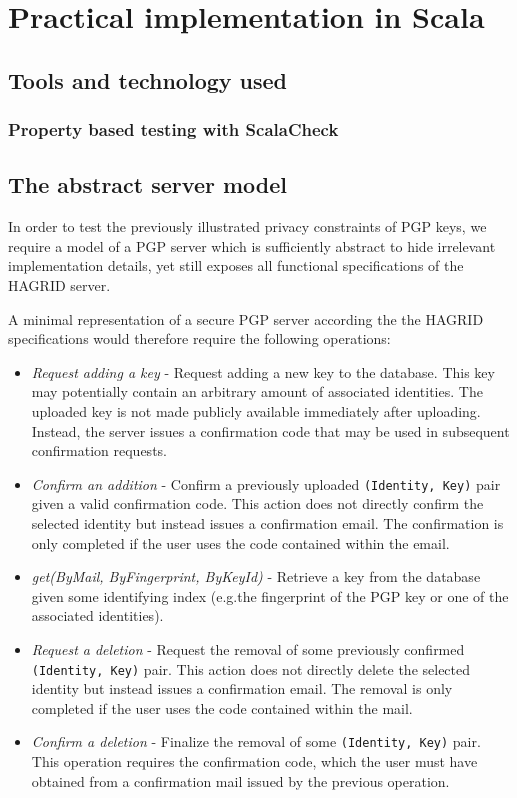 
\section{Practical implementation in Scala}
\subsection{Tools and technology used}
\newpage
\subsubsection{Property based testing with ScalaCheck}
\newpage
\subsection{The abstract server model}
In order to test the previously illustrated privacy constraints of PGP keys, we require a model of a PGP server which is sufficiently abstract to hide irrelevant implementation details, yet still exposes all functional specifications of the HAGRID server.

A minimal representation of a secure PGP server according the the HAGRID specifications would therefore require the following operations:
\begin{itemize}
    \item \emph{Request adding a key} - Request adding a new key to the database. This key may potentially contain an arbitrary amount of associated identities. The uploaded key is not made publicly available immediately after uploading. Instead, the server issues a confirmation code that may be used in subsequent confirmation requests.
    \item \emph{Confirm an addition} - Confirm a previously uploaded \texttt{(Identity, Key)} pair given a valid confirmation code. This action does not directly confirm the selected identity but instead issues a confirmation email. The confirmation is only completed if the user uses the code contained within the email.
    \item \emph{get(ByMail, ByFingerprint, ByKeyId)} - Retrieve a key from the database given some identifying index (e.g.the fingerprint of the PGP key or one of the associated identities).
    \item \emph{Request a deletion} - Request the removal of some previously confirmed \texttt{(Identity, Key)} pair. This action does not directly delete the selected identity but instead issues a confirmation email. The removal is only completed if the user uses the code contained within the mail.
    \item \emph{Confirm a deletion} - Finalize the removal of some \texttt{(Identity, Key)} pair. This operation requires the confirmation code, which the user must have obtained from a confirmation mail issued by the previous operation.
\end{itemize}

